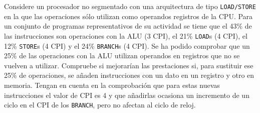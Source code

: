 \begin{ejercicio} \label{ej:1.5}
    Considere un procesador no segmentado con una arquitectura de tipo \verb|LOAD/STORE| en la que las
    operaciones sólo utilizan como operandos registros de la CPU. Para un conjunto de programas
    representativos de su actividad se tiene que el 43\% de las instrucciones son operaciones con la ALU (3 CPI),
    el 21\% \verb|LOAD|s (4 CPI), el 12\% \verb|STORE|s (4 CPI) y el 24\% \verb|BRANCH|s (4 CPI).
    Se ha podido comprobar que un 25\% de las operaciones con la ALU utilizan operandos en registros que no se
    vuelven a utilizar. Compruebe si mejorarían las prestaciones si, para sustituir ese 25\% de operaciones, se
    añaden instrucciones con un dato en un registro y otro en memoria. Tengan en cuenta en la comprobación que para estas nuevas instrucciones el valor de CPI es 4 y que añadirlas ocasiona un incremento de un ciclo
    en el CPI de los \verb|BRANCH|, pero no afectan al ciclo de reloj.\\


\end{ejercicio}
